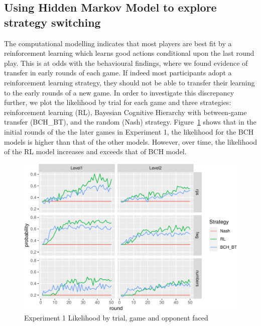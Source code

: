 \documentclass[
  english,
  man,floatsintext]{apa6}
\begin{document}
\hypertarget{using-hidden-markov-model-to-explore-strategy-switching}{%
\subsection{Using Hidden Markov Model to explore strategy switching}\label{using-hidden-markov-model-to-explore-strategy-switching}}

The computational modelling indicates that most players are best fit by a reinforcement learning which learns good actions conditional upon the last round play. This is at odds with the behavioural findings, where we found evidence of transfer in early rounds of each game. If indeed most participants adopt a reinforcement learning strategy, they should not be able to transfer their learning to the early rounds of a new game. In order to investigate this discrepancy further, we plot the likelihood by trial for each game and three strategies: reinforcement learning (RL), Bayesian Cognitive Hierarchy with between-game transfer (BCH\_BT), and the random (Nash) strategy. Figure~\ref{fig:exp1-lik-by-tr} shows that in the initial rounds of the the later games in Experiment 1, the likelihood for the BCH models is higher than that of the other models. However, over time, the likelihood of the RL model increases and exceeds that of BCH model.

\begin{figure}

{\centering \includegraphics{paper_draft_2021_files/figure-latex/exp1-lik-by-tr-1} 

}

\caption{Experiment 1 Likelihood by trial, game and opponent faced}\label{fig:exp1-lik-by-tr}
\end{figure}
\end{document}
